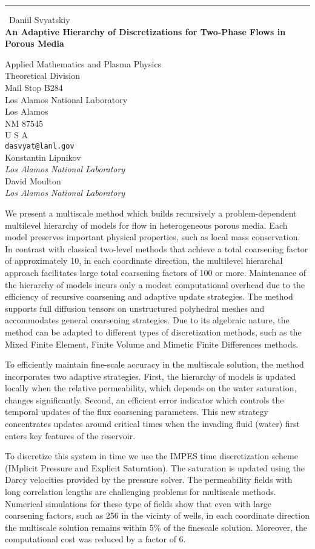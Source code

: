 \documentclass{report}
\begin{document}
\begin{center}
\rule{6in}{1pt} \
{\large Daniil Svyatskiy \\
{\bf An Adaptive Hierarchy of Discretizations for Two-Phase Flows in Porous Media}}

Applied Mathematics and Plasma Physics \\ Theoretical Division \\ Mail Stop B284 \\ Los Alamos National Laboratory \\ Los Alamos \\ NM 87545 \\ U S A
\\
{\tt dasvyat@lanl.gov}\\
Konstantin Lipnikov\\
{\em Los Alamos National Laboratory}\\
David Moulton\\
{\em Los Alamos National Laboratory}\end{center}

We present a multiscale method which builds recursively a
problem-dependent multilevel hierarchy of models for flow in
heterogeneous porous media. Each model preserves important physical
properties, such as local mass conservation. In contrast with classical
two-level methods that achieve a total coarsening factor of approximately
10, in each coordinate direction, the multilevel hierarchal approach
facilitates large total coarsening factors of 100 or more.
Maintenance of the hierarchy of models incurs only a modest
computational overhead due to the efficiency of recursive
coarsening and adaptive update strategies. The method supports full
diffusion tensors on unstructured polyhedral meshes and accommodates
general coarsening strategies. Due to its algebraic nature, the method
can be adapted to different types of discretization methods, such as the
Mixed Finite
Element, Finite Volume and Mimetic Finite Differences methods.


To efficiently maintain fine-scale accuracy in the multiscale
solution, the method incorporates two adaptive
strategies. First, the hierarchy of models is updated locally when
the relative permeability, which depends on the water saturation,
changes significantly. Second, an efficient error indicator which
controls the temporal updates of the flux coarsening parameters. This new
strategy concentrates updates around critical times when the invading
fluid (water) first enters key features of the reservoir.

To discretize this system in time we use the IMPES time discretization
scheme (IMplicit Pressure and Explicit Saturation). The saturation is
updated using the Darcy velocities provided by the pressure solver. The
permeability fields with long correlation lengths are challenging
problems for multiscale methods. Numerical simulations for these type of
fields show that even with large coarsening factors, such as 256 in the
vicinty of wells, in each coordinate direction the multiscale solution
remains within 5\% of the finescale solution. Moreover, the computational
cost was reduced by a factor of 6.
\end{document}
